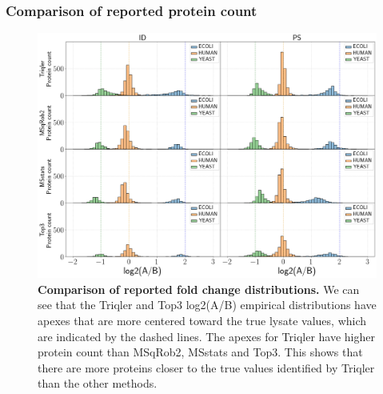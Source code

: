 \documentclass[11pt]{article}
\begin{document}
\subsubsection*{Comparison of reported protein count}
\begin{figure}[hbt]
    \centering
    \setlength{\tabcolsep}{0pt}

    \includegraphics[width=\linewidth]{../../result/report_plots/gridplot_histogram.png} 


    \caption{{\bf Comparison of reported fold change distributions.} We can see that the Triqler and Top3 log2(A/B) empirical distributions have apexes that are more centered toward the true lysate values, which are indicated by the dashed lines. The apexes for Triqler have higher protein count than MSqRob2, MSstats and Top3. This shows that there are more proteins closer to the true values identified by Triqler than the other methods. \label{fig:fc_histogram_supplement}}
\end{figure}
\end{document}
